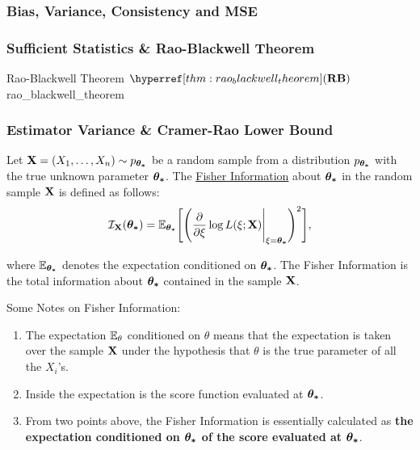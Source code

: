 \subsubsection{Bias, Variance, Consistency and MSE}

\subsubsection{Sufficient Statistics \& Rao-Blackwell Theorem}
\begin{theorem}{Rao-Blackwell Theorem $\RB$}{rao_blackwell_theorem}
     
\end{theorem}


\subsubsection{Estimator Variance \& Cramer-Rao Lower Bound}
\begin{definition}
    Let ${\bf X}=(X_1, \dots, X_n) \sim p_{\boldsymbol{\theta_*}}$ be a random sample from a distribution $p_{\boldsymbol{\theta_*}}$ with the true unknown parameter $\boldsymbol{\theta_*}$. The \underline{Fisher Information} about $\boldsymbol{\theta_*}$ in the random sample ${\bf X}$ is defined as follows:
    \begin{equation}
        \mathcal{I}_{\bf X}(\boldsymbol{\theta_*}) = \mathbb{E}_{\boldsymbol{\theta_*}}\Bigg[ 
            \Bigg( 
                \frac{\partial}{\partial\xi}\log L(\xi;{\bf X})\Bigg|_{\xi=\boldsymbol{\theta_*}}
             \Bigg)^2
         \Bigg],
    \end{equation}

    \noindent where $\mathbb{E}_{\boldsymbol{\theta_*}}$ denotes the expectation conditioned on $\boldsymbol{\theta_*}$. The Fisher Information is the total information about $\boldsymbol{\theta_*}$ contained in the sample ${\bf X}$.
\end{definition}

\begin{remark}
    Some Notes on Fisher Information:
    \begin{enumerate}
        \item The expectation $\mathbb{E}_\theta$ conditioned on $\theta$ means that the expectation is taken over the sample ${\bf X}$ under the hypothesis that $\theta$ is the true parameter of all the $X_i$'s. 

        \item Inside the expectation is the score function evaluated at $\boldsymbol{\theta_*}$.
        \item From two points above, the Fisher Information is essentially calculated as \textbf{the expectation conditioned on $\boldsymbol{\theta_*}$ of the score evaluated at $\boldsymbol{\theta_*}$}.
    \end{enumerate} 
\end{remark} 

